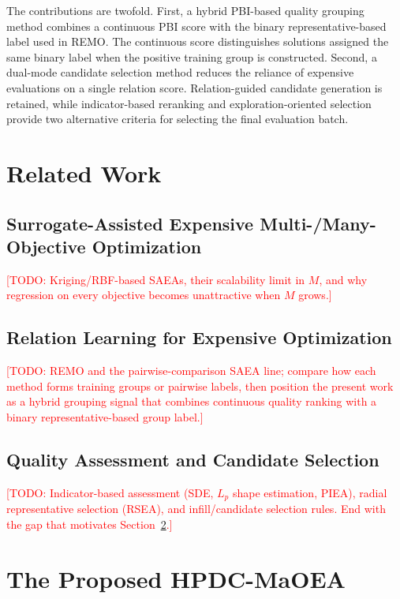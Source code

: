 \documentclass[final,5p,times,twocolumn]{elsarticle}
\newcommand{\TODO}[1]{\textcolor{red}{[TODO: #1]}}
\begin{document}
The contributions are twofold. First, a hybrid PBI-based quality grouping
method combines a continuous PBI score with the binary representative-based
label used in REMO. The continuous score distinguishes solutions assigned the
same binary label when the positive training group is constructed. Second, a
dual-mode candidate selection method reduces the reliance of expensive
evaluations on a single relation score. Relation-guided candidate generation is
retained, while indicator-based reranking and exploration-oriented selection
provide two alternative criteria for selecting the final evaluation batch.

\section{Related Work}
\label{sec:related}

\subsection{Surrogate-Assisted Expensive Multi-/Many-Objective Optimization}
\label{sec:related:saea}
\TODO{Kriging/RBF-based SAEAs, their scalability limit in $M$, and why
regression on every objective becomes unattractive when $M$ grows.}

\subsection{Relation Learning for Expensive Optimization}
\label{sec:related:relation}
\TODO{REMO and the pairwise-comparison SAEA line; compare how each method forms
training groups or pairwise labels, then position the present work as a hybrid
grouping signal that combines continuous quality ranking with a binary
representative-based group label.}

\subsection{Quality Assessment and Candidate Selection}
\label{sec:related:selection}
\TODO{Indicator-based assessment (SDE, $L_p$ shape estimation, PIEA), radial
representative selection (RSEA), and infill/candidate selection rules. End with
the gap that motivates Section~\ref{sec:method}.}

\section{The Proposed HPDC-MaOEA}
\label{sec:method}
\end{document}
